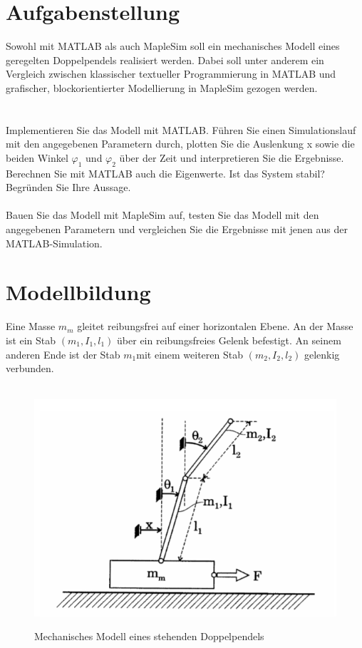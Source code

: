 \documentclass[a4paper, 10pt]{report}
\begin{document}
\chapter{Aufgabenstellung}
\renewcommand{\thechapter}{1}
Sowohl mit MATLAB als auch MapleSim soll ein mechanisches Modell eines geregelten Doppelpendels realisiert werden. Dabei soll unter anderem ein Vergleich zwischen klassischer textueller Programmierung in MATLAB und grafischer, blockorientierter Modellierung in MapleSim gezogen werden.
\\
\\
\\Implementieren Sie das Modell mit MATLAB. Führen Sie einen Simulationslauf mit den angegebenen Parametern durch, plotten Sie die Auslenkung x sowie die beiden Winkel $\varphi_{1}$ und $\varphi_{2}$ über der Zeit und interpretieren Sie die Ergebnisse. Berechnen Sie mit MATLAB auch die Eigenwerte. Ist das System stabil? Begründen Sie Ihre Aussage.
\\
\\
Bauen Sie das Modell mit MapleSim auf, testen Sie das Modell mit den angegebenen Parametern und vergleichen Sie die Ergebnisse mit jenen aus der MATLAB-Simulation.

\renewcommand{\thechapter}{} %
\chapter{Modellbildung}
\renewcommand{\thechapter}{2}

Eine Masse $ m_{m} $ gleitet reibungsfrei auf einer horizontalen Ebene. An der Masse ist ein Stab $ (m_{1}, I_{1}, l_{1}) $ über ein reibungsfreies Gelenk befestigt. An seinem anderen Ende ist der Stab $m_{1} $mit einem weiteren Stab $ (m_{2}, I_{2}, l_{2}) $ gelenkig verbunden.
\\
\\
\begin{figure}[h]
\centering  %
{\includegraphics[width=15cm]{Modell_Doppelpendel}}
\caption{Mechanisches Modell eines stehenden Doppelpendels}
\end{figure}
\noindent
\end{document}

